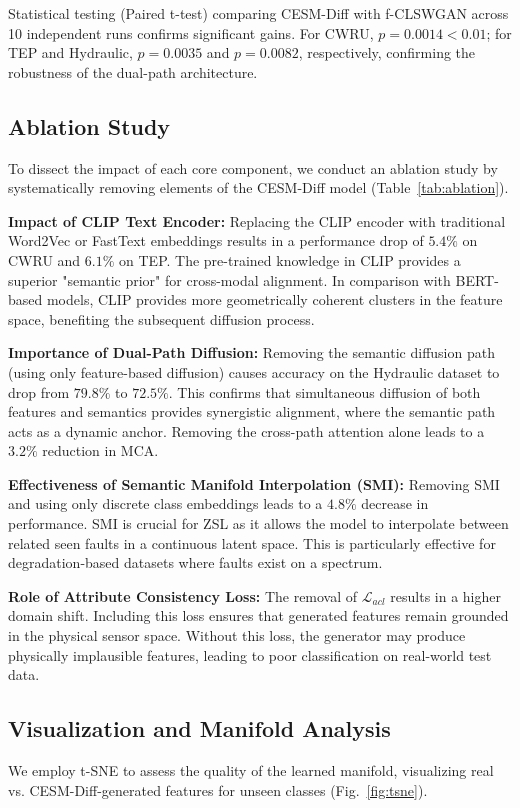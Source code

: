 Statistical testing (Paired t-test) comparing CESM-Diff with f-CLSWGAN across 10 independent runs confirms significant gains. For CWRU, $p=0.0014 < 0.01$; for TEP and Hydraulic, $p=0.0035$ and $p=0.0082$, respectively, confirming the robustness of the dual-path architecture.

\subsection{Ablation Study}
To dissect the impact of each core component, we conduct an ablation study by systematically removing elements of the CESM-Diff model (Table~\ref{tab:ablation}).

\textbf{Impact of CLIP Text Encoder:} 
Replacing the CLIP encoder with traditional Word2Vec or FastText embeddings results in a performance drop of $5.4\%$ on CWRU and $6.1\%$ on TEP. The pre-trained knowledge in CLIP provides a superior "semantic prior" for cross-modal alignment. In comparison with BERT-based models, CLIP provides more geometrically coherent clusters in the feature space, benefiting the subsequent diffusion process.

\textbf{Importance of Dual-Path Diffusion:} 
Removing the semantic diffusion path (using only feature-based diffusion) causes accuracy on the Hydraulic dataset to drop from $79.8\%$ to $72.5\%$. This confirms that simultaneous diffusion of both features and semantics provides synergistic alignment, where the semantic path acts as a dynamic anchor. Removing the cross-path attention alone leads to a $3.2\%$ reduction in MCA.

\textbf{Effectiveness of Semantic Manifold Interpolation (SMI):} 
Removing SMI and using only discrete class embeddings leads to a $4.8\%$ decrease in performance. SMI is crucial for ZSL as it allows the model to interpolate between related seen faults in a continuous latent space. This is particularly effective for degradation-based datasets where faults exist on a spectrum.

\textbf{Role of Attribute Consistency Loss:} 
The removal of $\mathcal{L}_{acl}$ results in a higher domain shift. Including this loss ensures that generated features remain grounded in the physical sensor space. Without this loss, the generator may produce physically implausible features, leading to poor classification on real-world test data.

\subsection{Visualization and Manifold Analysis}
We employ t-SNE to assess the quality of the learned manifold, visualizing real vs. CESM-Diff-generated features for unseen classes (Fig.~\ref{fig:tsne}). 

